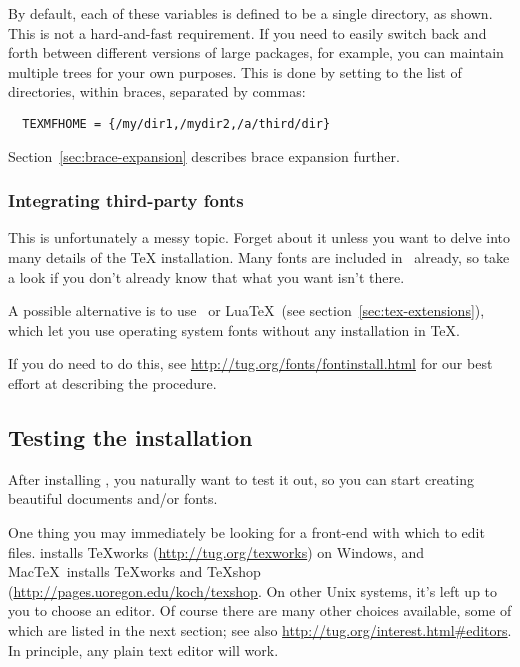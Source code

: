 \documentclass{article}
\begin{document}
By default, each of these variables is defined to be a single directory,
as shown.  This is not a hard-and-fast requirement.  If you need to
easily switch back and forth between different versions of large
packages, for example, you can maintain multiple trees for your own
purposes.  This is done by setting  to the
list of directories, within braces, separated by commas:

\begin{verbatim}
  TEXMFHOME = {/my/dir1,/mydir2,/a/third/dir}
\end{verbatim}

Section~\ref{sec:brace-expansion} describes brace expansion further.


\subsubsection{Integrating third-party fonts}

This is unfortunately a messy topic.  Forget about it unless you want to
delve into many details of the \TeX{} installation.  Many fonts are
included in \TL\ already, so take a look if you don't already know 
that what you want isn't there.

A possible alternative is to use \XeTeX\ or Lua\TeX\ (see
section~\ref{sec:tex-extensions}), which let you use operating system
fonts without any installation in \TeX.

If you do need to do this, see
\url{http://tug.org/fonts/fontinstall.html} for our best effort at
describing the procedure.


\subsection{Testing the installation}
\label{sec:test-install}

After installing \TL{}, you naturally want to test it out, so you can
start creating beautiful documents and\slash or fonts.

One thing you may immediately be looking for a front-end with which to
edit files.  \TL{} installs \TeX{}works (\url{http://tug.org/texworks})
on Windows, and Mac\TeX\ installs \TeX{}works and TeXshop
(\url{http://pages.uoregon.edu/koch/texshop}.  On other Unix systems,
it's left up to you to choose an editor.  Of course there are many other
choices available, some of which are listed in the next section; see
also \url{http://tug.org/interest.html#editors}.  In principle, any
plain text editor will work.
\end{document}
